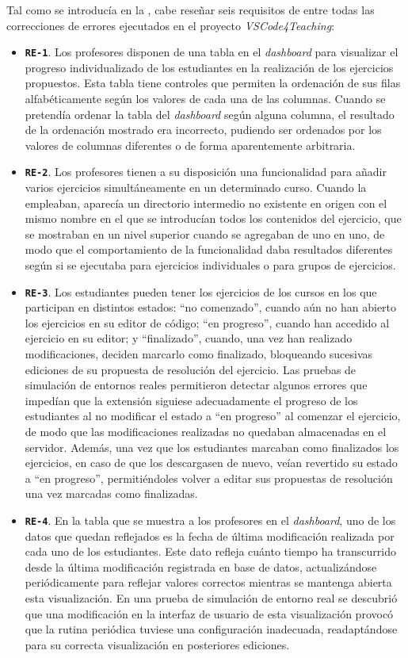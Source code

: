 Tal como se introducía en la , cabe reseñar seis requisitos de entre todas las correcciones de errores ejecutados en el proyecto \textit{VSCode4Teaching}:
\begin{itemize}
    \item \texttt{\textbf{RE-1}}. Los profesores disponen de una tabla en el \textit{dashboard} para visualizar el progreso individualizado de los estudiantes en la realización de los ejercicios propuestos. Esta tabla tiene controles que permiten la ordenación de sus filas alfabéticamente según los valores de cada una de las columnas. Cuando se pretendía ordenar la tabla del \textit{dashboard} según alguna columna, el resultado de la ordenación mostrado era incorrecto, pudiendo ser ordenados por los valores de columnas diferentes o de forma aparentemente arbitraria.
    \item \texttt{\textbf{RE-2}}. Los profesores tienen a su disposición una funcionalidad para añadir varios ejercicios simultáneamente en un determinado curso. Cuando la empleaban, aparecía un directorio intermedio no existente en origen con el mismo nombre en el que se introducían todos los contenidos del ejercicio, que se mostraban en un nivel superior cuando se agregaban de uno en uno, de modo que el comportamiento de la funcionalidad daba resultados diferentes según si se ejecutaba para ejercicios individuales o para grupos de ejercicios.
    \item \texttt{\textbf{RE-3}}. Los estudiantes pueden tener los ejercicios de los cursos en los que participan en distintos estados: ``no comenzado'', cuando aún no han abierto los ejercicios en su editor de código; ``en progreso'', cuando han accedido al ejercicio en su editor; y ``finalizado'', cuando, una vez han realizado modificaciones, deciden marcarlo como finalizado, bloqueando sucesivas ediciones de su propuesta de resolución del ejercicio. Las pruebas de simulación de entornos reales permitieron detectar algunos errores que impedían que la extensión siguiese adecuadamente el progreso de los estudiantes al no modificar el estado a ``en progreso'' al comenzar el ejercicio, de modo que las modificaciones realizadas no quedaban almacenadas en el servidor. Además, una vez que los estudiantes marcaban como finalizados los ejercicios, en caso de que los descargasen de nuevo, veían revertido su estado a ``en progreso'', permitiéndoles volver a editar sus propuestas de resolución una vez marcadas como finalizadas.
    \item \texttt{\textbf{RE-4}}. En la tabla que se muestra a los profesores en el \textit{dashboard}, uno de los datos que quedan reflejados es la fecha de última modificación realizada por cada uno de los estudiantes. Este dato refleja cuánto tiempo ha transcurrido desde la última modificación registrada en base de datos, actualizándose periódicamente para reflejar valores correctos mientras se mantenga abierta esta visualización. En una prueba de simulación de entorno real se descubrió que una modificación en la interfaz de usuario de esta visualización provocó que la rutina periódica tuviese una configuración inadecuada, readaptándose para su correcta visualización en posteriores ediciones.

\end{itemize}
